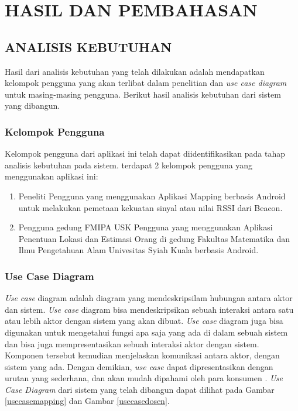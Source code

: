 \fancyhf{}
\fancyfoot[C]{\thepage}
\chapter{HASIL DAN PEMBAHASAN}
\section{\uppercase{ANALISIS KEBUTUHAN}}

Hasil dari analisis kebutuhan yang telah dilakukan adalah mendapatkan kelompok pengguna yang akan terlibat dalam penelitian dan \textit{use case diagram} untuk masing-masing pengguna. Berikut hasil analisis kebutuhan dari sistem yang dibangun.

\subsection{Kelompok Pengguna}
Kelompok pengguna dari aplikasi ini telah dapat diidentifikasikan pada tahap analisis kebutuhan pada sistem. terdapat 2 kelompok pengguna yang menggunakan aplikasi ini:
\begin{enumerate}[1.]
	\item Peneliti
	      \newline Pengguna yang menggunakan Aplikasi Mapping berbasis Android untuk melakukan pemetaan kekuatan sinyal atau nilai RSSI dari Beacon.
	\item Pengguna gedung FMIPA USK
	      \newline Pengguna yang menggunakan Aplikasi Penentuan Lokasi dan Estimasi Orang di gedung Fakultas Matematika dan Ilmu Pengetahuan Alam Univesitas Syiah Kuala berbasis Android.
\end{enumerate}

\subsection{Use Case Diagram}
\textit{Use case} diagram adalah diagram yang mendeskripsilam hubungan antara aktor dan sistem. \textit{Use case} diagram bisa mendeskripsikan sebuah interaksi antara satu atau lebih aktor dengan sistem yang akan dibuat. \textit{Use case} diagram juga bisa digunakan untuk mengetahui fungsi apa saja yang ada di dalam sebuah sistem dan  bisa juga mempresentasikan sebuah interaksi aktor dengan sistem. Komponen tersebut kemudian menjelaskan komunikasi antara aktor,  dengan sistem yang ada. Dengan demikian, \textit{use case} dapat dipresentasikan dengan urutan yang sederhana, dan akan mudah dipahami oleh para konsumen \citep{Yu2009}. \textit{Use Case Diagram} dari sistem yang telah dibangun dapat dilihat pada Gambar \ref{usecasemapping} dan Gambar \ref{usecasedosen}.

